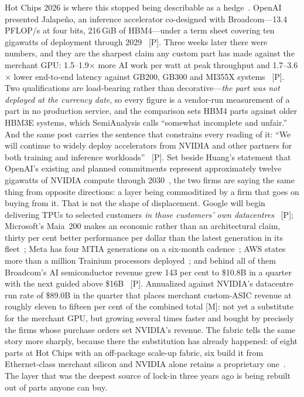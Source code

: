 Hot Chips 2026 is where this stopped being describable as a hedge~\cite{hc2026}. OpenAI presented Jalape\~no, an inference accelerator co-designed with Broadcom---13.4 PFLOP/s at four bits, 216\,GiB of HBM4---under a term sheet covering ten gigawatts of deployment through 2029~\cite{hc2026-jalapeno,openai-broadcom} [P]. Three weeks later there were numbers, and they are the sharpest claim any custom part has made against the merchant GPU: 1.5--1.9$\times$ more AI work per watt at peak throughput and 1.7--3.6$\times$ lower end-to-end latency against GB200, GB300 and MI355X systems~\cite{jalapeno-results} [P]. Two qualifications are load-bearing rather than decorative---\emph{the part was not deployed at the currency date}, so every figure is a vendor-run measurement of a part in no production service, and the comparison sets HBM4 parts against older HBM3E systems, which SemiAnalysis calls ``somewhat incomplete and unfair.'' And the same post carries the sentence that constrains every reading of it: ``We will continue to widely deploy accelerators from NVIDIA and other partners for both training and inference workloads''~\cite{jalapeno-results} [P]. Set beside Huang's statement that OpenAI's existing and planned commitments represent approximately twelve gigawatts of NVIDIA compute through 2030~\cite{nvda-huang-q2}, the two firms are saying the same thing from opposite directions: a layer being commoditized by a firm that goes on buying from it. That is not the shape of displacement. Google will begin delivering TPUs to selected customers \emph{in those customers' own datacentres}~\cite{hc2026-tpu8,tpu-external} [P]; Microsoft's Maia~200 makes an economic rather than an architectural claim, thirty per cent better performance per dollar than the latest generation in its fleet~\cite{maia200}; Meta has four MTIA generations on a six-month cadence~\cite{mtia400}; AWS states more than a million Trainium processors deployed~\cite{trainium3}; and behind all of them Broadcom's AI semiconductor revenue grew 143 per cent to \$10.8B in a quarter with the next guided above \$16B~\cite{broadcom-q2fy26} [P]. Annualized against NVIDIA's datacentre run rate of \$89.0B in the quarter that places merchant custom-ASIC revenue at roughly eleven to fifteen per cent of the combined total [M]: not yet a substitute for the merchant GPU, but growing several times faster and bought by precisely the firms whose purchase orders set NVIDIA's revenue. The fabric tells the same story more sharply, because there the substitution has already happened: of eight parts at Hot Chips with an off-package scale-up fabric, six build it from Ethernet-class merchant silicon and NVIDIA alone retains a proprietary one~\cite{hc2026-scaleup}. The layer that was the deepest source of lock-in three years ago is being rebuilt out of parts anyone can buy.

